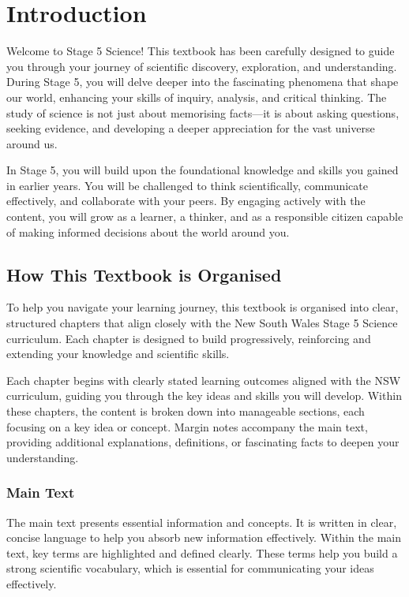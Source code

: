 \chapter{Introduction}

Welcome to Stage 5 Science! This textbook has been carefully designed to guide you through your journey of scientific discovery, exploration, and understanding. During Stage 5, you will delve deeper into the fascinating phenomena that shape our world, enhancing your skills of inquiry, analysis, and critical thinking. The study of science is not just about memorising facts—it is about asking questions, seeking evidence, and developing a deeper appreciation for the vast universe around us.

In Stage 5, you will build upon the foundational knowledge and skills you gained in earlier years. You will be challenged to think scientifically, communicate effectively, and collaborate with your peers. By engaging actively with the content, you will grow as a learner, a thinker, and as a responsible citizen capable of making informed decisions about the world around you.

\section{How This Textbook is Organised}

To help you navigate your learning journey, this textbook is organised into clear, structured chapters that align closely with the New South Wales Stage 5 Science curriculum. Each chapter is designed to build progressively, reinforcing and extending your knowledge and scientific skills.

Each chapter begins with clearly stated learning outcomes aligned with the NSW curriculum, guiding you through the key ideas and skills you will develop. Within these chapters, the content is broken down into manageable sections, each focusing on a key idea or concept. Margin notes accompany the main text, providing additional explanations, definitions, or fascinating facts to deepen your understanding.

\subsection{Main Text}

The main text presents essential information and concepts. It is written in clear, concise language to help you absorb new information effectively. Within the main text, key terms are highlighted and defined clearly. These terms help you build a strong scientific vocabulary, which is essential for communicating your ideas effectively.

